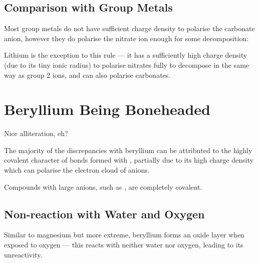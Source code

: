 


		\subsection{Comparison with Group  Metals}

			Most group  metals do not have sufficient charge density to polarise the
			carbonate anion, however they do polarise the nitrate ion enough for some decomposition:


			Lithium is the exception to this rule --- it has a sufficiently high charge density (due to its
			tiny ionic radius) to polarise nitrates fully to decompose in the same way as group 2 ions, and
			can also polarise carbonates.





	\section{Beryllium Being Boneheaded}

		Nice alliteration, eh?

		The majority of the discrepancies with beryllium can be attributed to the highly covalent character
		of bonds formed with , partially due to its high charge density which can polarise the electron
		cloud of anions.

		Compounds with large anions, such as , are completely covalent.



		\subsection{Non-reaction with Water and Oxygen}

			Similar to magnesium but more extreme, beryllium forms an  oxide layer when
			exposed to oxygen --- this reacts with neither water nor oxygen, leading to its unreactivity.

